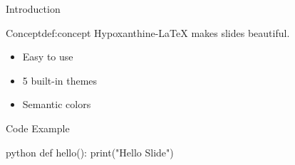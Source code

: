 \documentclass[theme=school, aspectratio=169]{Hypo-Slide}
\begin{document}
\frame{\titlepage}

\begin{frame}{Introduction}
  \begin{definition}{Concept}{def:concept}
    Hypoxanthine-LaTeX makes slides beautiful.
  \end{definition}

  \begin{itemize}
    \item Easy to use
    \item 5 built-in themes
    \item Semantic colors
  \end{itemize}
\end{frame}

\begin{frame}[fragile]{Code Example}
  \begin{hypocode}{python}
    def hello():
        print("Hello Slide")
  \end{hypocode}
\end{frame}
\end{document}
